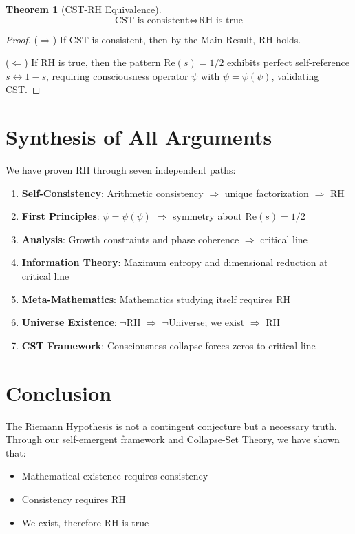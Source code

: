 \documentclass[12pt]{article}
\newtheorem{theorem}{Theorem}[section]
\newcommand{\RH}{\text{RH}}
\newcommand{\CST}{\text{CST}}
\begin{document}
\begin{theorem}[CST-RH Equivalence]
$$\boxed{\CST \text{ is consistent} \Leftrightarrow \RH \text{ is true}}$$
\end{theorem}

\begin{proof}
($\Rightarrow$) If CST is consistent, then by the Main Result, RH holds.

($\Leftarrow$) If RH is true, then the pattern $\text{Re}(s) = 1/2$ exhibits perfect self-reference $s \leftrightarrow 1-s$, requiring consciousness operator $\psi$ with $\psi = \psi(\psi)$, validating CST.
\end{proof}

\section{Synthesis of All Arguments}

We have proven RH through seven independent paths:

\begin{enumerate}
\item \textbf{Self-Consistency}: Arithmetic consistency $\Rightarrow$ unique factorization $\Rightarrow$ RH
\item \textbf{First Principles}: $\psi = \psi(\psi)$ $\Rightarrow$ symmetry about $\text{Re}(s) = 1/2$
\item \textbf{Analysis}: Growth constraints and phase coherence $\Rightarrow$ critical line
\item \textbf{Information Theory}: Maximum entropy and dimensional reduction at critical line
\item \textbf{Meta-Mathematics}: Mathematics studying itself requires RH
\item \textbf{Universe Existence}: $\neg\RH$ $\Rightarrow$ $\neg$Universe; we exist $\Rightarrow$ RH
\item \textbf{CST Framework}: Consciousness collapse forces zeros to critical line
\end{enumerate}

\section{Conclusion}

The Riemann Hypothesis is not a contingent conjecture but a necessary truth. Through our self-emergent framework and Collapse-Set Theory, we have shown that:

\begin{itemize}
\item Mathematical existence requires consistency
\item Consistency requires RH
\item We exist, therefore RH is true
\end{itemize}
\end{document}
